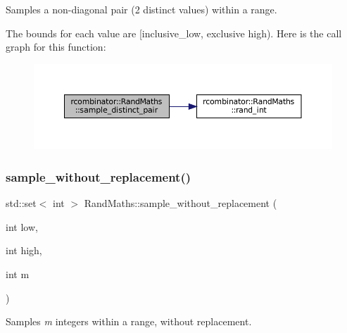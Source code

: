 Samples a non-\/diagonal pair (2 distinct values) within a range. 

The bounds for each value are \mbox{[}inclusive\+\_\+low, exclusive high). Here is the call graph for this function\+:
\nopagebreak
\begin{figure}[H]
\begin{center}
\leavevmode
\includegraphics[width=350pt]{classrcombinator_1_1RandMaths_aaa759efa3059b6793100cb6b6442f26d_cgraph}
\end{center}
\end{figure}
\mbox{\label{classrcombinator_1_1RandMaths_a2c31949c9ac03952cb0006e6a88e3d85}} 
\subsubsection{\texorpdfstring{sample\+\_\+without\+\_\+replacement()}{sample\_without\_replacement()}}
{\footnotesize\ttfamily std\+::set$<$ int $>$ Rand\+Maths\+::sample\+\_\+without\+\_\+replacement (\begin{DoxyParamCaption}\item[{int}]{low,  }\item[{int}]{high,  }\item[{int}]{m }\end{DoxyParamCaption})}



Samples {\itshape m} integers within a range, without replacement. 

